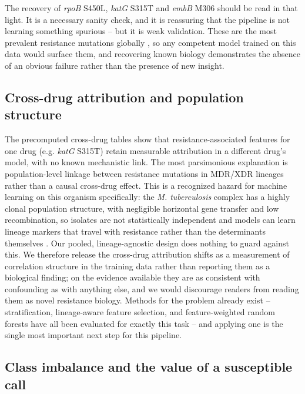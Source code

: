 The recovery of \emph{rpoB} S450L, \emph{katG} S315T and \emph{embB} M306 should be read in that light. It is a necessary sanity check, and it is reassuring that the pipeline is not learning something spurious -- but it is weak validation. These are the most prevalent resistance mutations globally \cite{who2023catalogue}, so any competent model trained on this data would surface them, and recovering known biology demonstrates the absence of an obvious failure rather than the presence of new insight.

\subsection{Cross-drug attribution and population structure}

The precomputed cross-drug tables show that resistance-associated features for one drug (e.g. \emph{katG} S315T) retain measurable attribution in a different drug's model, with no known mechanistic link. The most parsimonious explanation is population-level linkage between resistance mutations in MDR/XDR lineages rather than a causal cross-drug effect. This is a recognized hazard for machine learning on this organism specifically: the \emph{M. tuberculosis} complex has a highly clonal population structure, with negligible horizontal gene transfer and low recombination, so isolates are not statistically independent and models can learn lineage markers that travel with resistance rather than the determinants themselves \cite{billows2023feature}. Our pooled, lineage-agnostic design does nothing to guard against this. We therefore release the cross-drug attribution shifts as a measurement of correlation structure in the training data rather than reporting them as a biological finding; on the evidence available they are as consistent with confounding as with anything else, and we would discourage readers from reading them as novel resistance biology. Methods for the problem already exist -- stratification, lineage-aware feature selection, and feature-weighted random forests have all been evaluated for exactly this task \cite{billows2023feature} -- and applying one is the single most important next step for this pipeline.

\subsection{Class imbalance and the value of a susceptible call}

